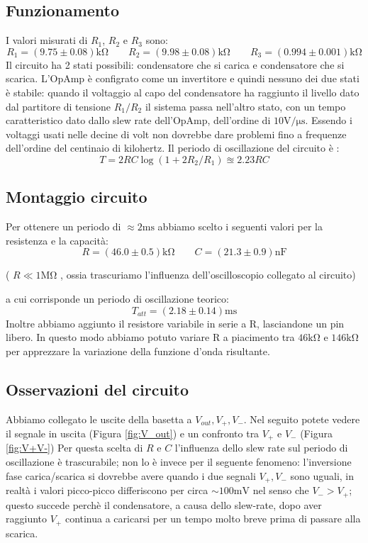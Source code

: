 \documentclass[10pt,a4paper]{article}
\begin{document}
\subsection{Funzionamento}
I valori misurati di $R_1$, $R_2$ e $R_3$ sono:
\[ R_1 = (9.75\pm 0.08)\si{\kilo\ohm} \qquad  R_2 = (9.98 \pm 0.08)\si{\kilo\ohm} \qquad   R_3 = ( 0.994 \pm0.001 ) \si{\kilo\ohm}\]
  Il circuito ha 2 stati possibili: condensatore che si carica e condensatore che si  scarica. L'OpAmp è configrato come un invertitore e quindi nessuno dei due stati è stabile: quando il voltaggio al capo del condensatore ha raggiunto il livello dato dal partitore di tensione $R_1/R_2$ il sistema passa nell'altro stato, con un tempo caratteristico dato dallo slew rate dell'OpAmp, dell'ordine di $10 \si{\volt\per\micro\second}$. Essendo i voltaggi usati nelle decine di volt non dovrebbe dare problemi fino a frequenze dell'ordine del centinaio di kilohertz.\label{slew_rate_count}
Il periodo di oscillazione del circuito è : \[ T = 2 RC \log( 1+ 2 R_2/R_1) \approxeq 2.23 RC\]
\subsection{Montaggio circuito}
Per ottenere un periodo di $\approx 2 \si{\milli\second}$ abbiamo scelto i seguenti valori per la resistenza e la capacità:
\[ R = ( 46.0 \pm0.5 )\si{\kilo\ohm} \qquad   C = (21.3\pm0.9 )\si{\nano \farad}\]

( $R \ll 1 \si{\mega\ohm}$ , ossia trascuriamo l'influenza dell'oscilloscopio collegato al circuito)

a cui corrisponde un periodo di oscillazione teorico:
\[T_{att}= (2.18\pm 0.14 )\si{\milli \second}\]
Inoltre abbiamo aggiunto il resistore variabile in serie a R, lasciandone un pin libero. In questo modo abbiamo potuto variare R a piacimento tra $46 \si{\kilo\ohm}$ e $146 \si{\kilo\ohm}$ per apprezzare la variazione della funzione d'onda risultante.


\subsection{Osservazioni del circuito}
Abbiamo collegato le uscite della basetta a $V_{out}, V_{+}, V_{-}$. Nel seguito potete vedere il segnale in uscita (Figura \ref{fig:V_out}) e un confronto tra $V_{+}$ e $V_{-}$ (Figura \ref{fig:V+V-}) Per questa scelta di $R$ e $C$ l'influenza dello slew rate sul periodo di oscillazione è trascurabile; non lo è invece per il seguente fenomeno: l'inversione fase carica/scarica si dovrebbe avere quando i due segnali $ V_{+}, V_{-}$ sono uguali, in realtà i valori  picco-picco differiscono per circa $\sim 100 \si{\milli \volt}$ nel senso che $ V_{-}> V_{+}$; questo succede perchè il condensatore, a causa dello slew-rate,   dopo aver raggiunto $V_+$ continua a caricarsi per un tempo molto breve prima di passare alla scarica. 
\end{document}
